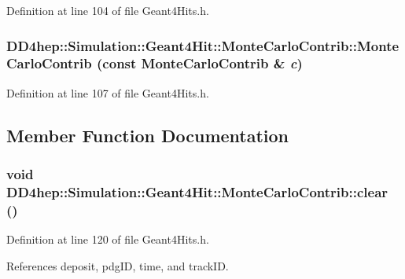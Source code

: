 Definition at line 104 of file Geant4Hits.h.\hypertarget{struct_d_d4hep_1_1_simulation_1_1_geant4_hit_1_1_monte_carlo_contrib_a13103caeeef9b6d184177690693f8f51}{
\subsubsection[{MonteCarloContrib}]{\setlength{\rightskip}{0pt plus 5cm}DD4hep::Simulation::Geant4Hit::MonteCarloContrib::MonteCarloContrib (const {\bf MonteCarloContrib} \& {\em c})}}
\label{struct_d_d4hep_1_1_simulation_1_1_geant4_hit_1_1_monte_carlo_contrib_a13103caeeef9b6d184177690693f8f51}


Definition at line 107 of file Geant4Hits.h.

\subsection{Member Function Documentation}
\hypertarget{struct_d_d4hep_1_1_simulation_1_1_geant4_hit_1_1_monte_carlo_contrib_a008953a5a8c03687349c791160d2c89e}{
\subsubsection[{clear}]{\setlength{\rightskip}{0pt plus 5cm}void DD4hep::Simulation::Geant4Hit::MonteCarloContrib::clear ()}}
\label{struct_d_d4hep_1_1_simulation_1_1_geant4_hit_1_1_monte_carlo_contrib_a008953a5a8c03687349c791160d2c89e}


Definition at line 120 of file Geant4Hits.h.

References deposit, pdgID, time, and trackID.

